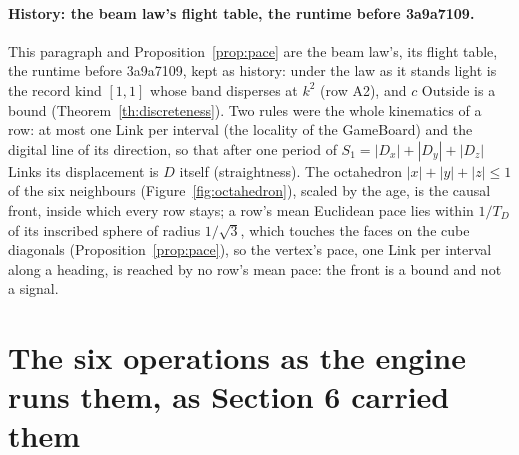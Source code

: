 \paragraph{History: the beam law's flight table, the runtime before 3a9a7109.} This paragraph and Proposition~\ref{prop:pace} are the beam law's, its flight table, the runtime before 3a9a7109, kept as history: under the law as it stands light is the record kind $[1, 1]$ whose band disperses at $k^2$ (row A2), and $c$ Outside is a bound (Theorem~\ref{th:discreteness}). Two rules were the whole kinematics of a row: at most one Link per interval (the locality of the GameBoard) and the digital line of its direction, so that after one period of $S_1 = |D_x| + |D_y| + |D_z|$ Links its displacement is $D$ itself (straightness). The octahedron $|x| + |y| + |z| \le 1$ of the six neighbours (Figure~\ref{fig:octahedron}), scaled by the age, is the causal front, inside which every row stays; a row's mean Euclidean pace lies within $1/T_D$ of its inscribed sphere of radius $1/\sqrt3$, which touches the faces on the cube diagonals (Proposition~\ref{prop:pace}), so the vertex's pace, one Link per interval along a heading, is reached by no row's mean pace: the front is a bound and not a signal.



\section{The six operations as the engine runs them, as Section 6 carried them}\label{rec:sixops}

